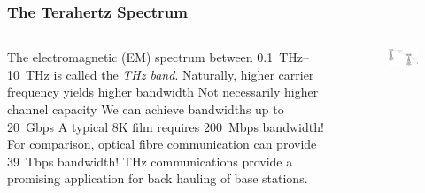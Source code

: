 \documentclass[10pt]{beamer}
\begin{document}
\begin{frame}
    \frametitle{The Terahertz Spectrum}
    \begin{columns}
        \normalsize
        \begin{column}{.6\textwidth}
            \begin{outline}
                \1 The electromagnetic (EM) spectrum between \SIrange{0.1}{10}{\THz} is called the \textit{THz band}.
                \1 Naturally, higher carrier frequency yields higher bandwidth
                \2 Not necessarily higher channel capacity
                \1 We can achieve bandwidths up to \SI{20}{Gbps}
                \2 A typical 8K film requires \SI{200}{Mbps} bandwidth!
                \2 For comparison, optical fibre communication can provide \SI{39}{Tbps} bandwidth!
                \1 THz communications provide a promising application for back hauling of base stations.
            \end{outline}
        \end{column}
        \begin{column}{.4\textwidth}
            \scriptsize
            \begin{figure}[T!]
                \centering
                \includegraphics[width=.95\textwidth]{backhaul.pdf}
                \label{fig:backhaul_network}
            \end{figure}
        \end{column}
    \end{columns}
\end{frame}
\end{document}
